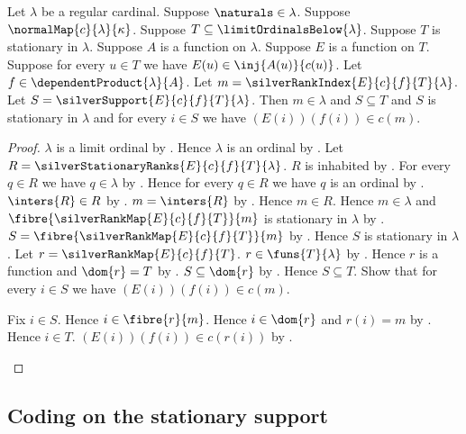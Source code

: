 \begin{theorem}\label{silver_support_properties}
    Let $\lambda$ be a regular cardinal.
    Suppose $\naturals\in\lambda$.
    Suppose $\normalMap{c}{\lambda}{\kappa}$.
    Suppose $T\subseteq\limitOrdinalsBelow{\lambda}$.
    Suppose $T$ is stationary in $\lambda$.
    Suppose $A$ is a function on $\lambda$.
    Suppose $E$ is a function on $T$.
    Suppose for every $u\in T$ we have
        $E(u)\in\inj{A(u)}{c(u)}$.
    Let $f\in\dependentProduct{\lambda}{A}$.
    Let $m=\silverRankIndex{E}{c}{f}{T}{\lambda}$.
    Let $S=\silverSupport{E}{c}{f}{T}{\lambda}$.
    Then $m\in\lambda$ and $S\subseteq T$ and
        $S$ is stationary in $\lambda$ and
        for every $i\in S$ we have $(E(i))(f(i))\in c(m)$.
\end{theorem}
\begin{proof}
    $\lambda$ is a limit ordinal
        by .
    Hence $\lambda$ is an ordinal by .
    Let $R=\silverStationaryRanks{E}{c}{f}{T}{\lambda}$.
    $R$ is inhabited by .
    For every $q\in R$ we have $q\in\lambda$
        by .
    Hence for every $q\in R$ we have $q$ is an ordinal
        by .
    $\inters{R}\in R$ by .
    $m=\inters{R}$ by .
    Hence $m\in R$.
    Hence $m\in\lambda$ and
        $\fibre{\silverRankMap{E}{c}{f}{T}}{m}$ is stationary in $\lambda$
        by .
    $S=\fibre{\silverRankMap{E}{c}{f}{T}}{m}$
        by .
    Hence $S$ is stationary in $\lambda$.
    Let $r=\silverRankMap{E}{c}{f}{T}$.
    $r\in\funs{T}{\lambda}$
        by .
    Hence $r$ is a function and $\dom{r}=T$
        by .
    $S\subseteq\dom{r}$
        by .
    Hence $S\subseteq T$.
    Show that for every $i\in S$ we have $(E(i))(f(i))\in c(m)$.
    \begin{subproof}
        Fix $i\in S$.
        Hence $i\in\fibre{r}{m}$.
        Hence $i\in\dom{r}$ and $r(i)=m$
            by .
        Hence $i\in T$.
        $(E(i))(f(i))\in c(r(i))$
            by .
    \end{subproof}
\end{proof}

\subsection{Coding on the stationary support}

